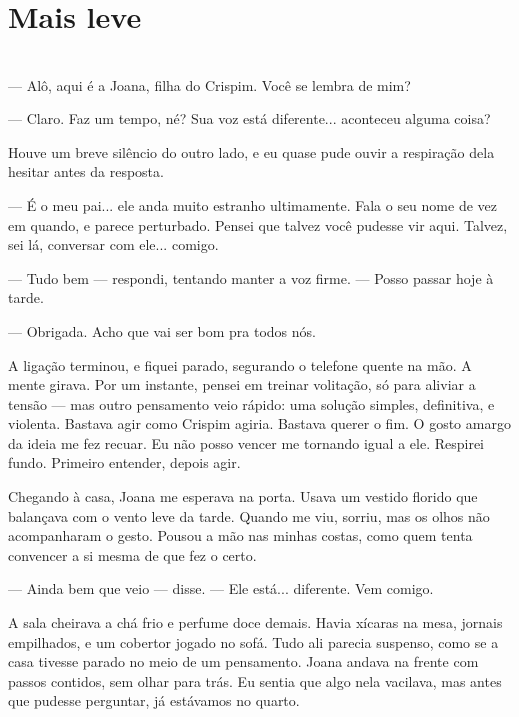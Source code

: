 \newpage

\ifdefined\useChapters
\chapter{Mais leve}
\else
\chapter{}
\fi

— Alô, aqui é a Joana, filha do Crispim. Você se lembra de mim?

— Claro. Faz um tempo, né? Sua voz está diferente... aconteceu alguma coisa?

Houve um breve silêncio do outro lado, e eu quase pude ouvir a respiração dela hesitar antes da resposta.

— É o meu pai... ele anda muito estranho ultimamente. Fala o seu nome de vez em quando, e parece perturbado. Pensei que talvez você pudesse vir aqui. Talvez, sei lá, conversar com ele... comigo.

— Tudo bem — respondi, tentando manter a voz firme. — Posso passar hoje à tarde.

— Obrigada. Acho que vai ser bom pra todos nós.

A ligação terminou, e fiquei parado, segurando o telefone quente na mão. A mente girava. Por um instante, pensei em treinar volitação, só para aliviar a tensão — mas outro pensamento veio rápido: uma solução simples, definitiva, e violenta. Bastava agir como Crispim agiria. Bastava querer o fim.  
O gosto amargo da ideia me fez recuar. Eu não posso vencer me tornando igual a ele.  
Respirei fundo. Primeiro entender, depois agir.

Chegando à casa, Joana me esperava na porta. Usava um vestido florido que balançava com o vento leve da tarde. Quando me viu, sorriu, mas os olhos não acompanharam o gesto. Pousou a mão nas minhas costas, como quem tenta convencer a si mesma de que fez o certo.

— Ainda bem que veio — disse. — Ele está... diferente. Vem comigo.

A sala cheirava a chá frio e perfume doce demais. Havia xícaras na mesa, jornais empilhados, e um cobertor jogado no sofá. Tudo ali parecia suspenso, como se a casa tivesse parado no meio de um pensamento.  
Joana andava na frente com passos contidos, sem olhar para trás. Eu sentia que algo nela vacilava, mas antes que pudesse perguntar, já estávamos no quarto.

